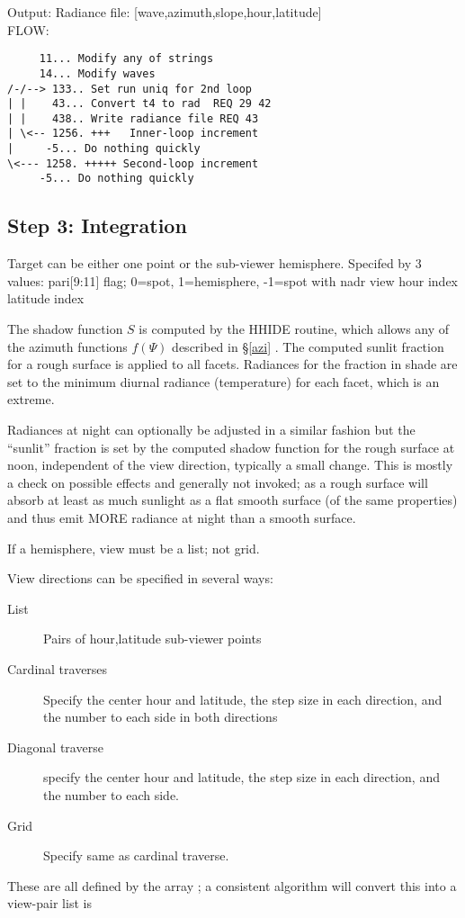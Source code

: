\documentclass{article}
\begin{document}
Output:  Radiance file: [wave,azimuth,slope,hour,latitude]
\\ FLOW:
\vspace{-3.mm} 
\begin{verbatim}
     11... Modify any of strings
     14... Modify waves
/-/--> 133.. Set run uniq for 2nd loop
| |    43... Convert t4 to rad  REQ 29 42
| |    438.. Write radiance file REQ 43
| \<-- 1256. +++   Inner-loop increment
|     -5... Do nothing quickly
\<--- 1258. +++++ Second-loop increment
     -5... Do nothing quickly
\end{verbatim} 

\subsection{Step 3: Integration}
Target can be either one point or the sub-viewer hemisphere. Specifed by 3 values:
pari[9:11] 
\qi flag; 0=spot, 1=hemisphere, -1=spot  with nadr view
\qi hour index
\qi latitude index

The shadow function $S$ is computed by the HHIDE routine, which allows any of the azimuth functions $f(\Psi)$ described in \S \ref{azi} . The computed sunlit fraction for a rough surface is applied to all facets.
Radiances for the fraction in shade are set to the minimum diurnal radiance (temperature) for each facet, which is an extreme.

Radiances at night can optionally be adjusted in a similar fashion but the ``sunlit'' fraction is set by the computed shadow function for the rough surface at noon, independent of the view direction, typically a small change. This is mostly a check on possible effects and generally not invoked; as a rough surface will absorb at least as much sunlight as a flat smooth surface (of the same properties) and thus emit MORE radiance at night than a smooth surface.

If a hemisphere, view must be a list; not grid.

View directions can be specified in several ways: 
\begin{description}    %
 \item [List] Pairs of hour,latitude sub-viewer points
 \item [Cardinal traverses] Specify the center hour and latitude, the step size in each direction, and the number to each side in both directions
 \item [Diagonal traverse]  specify the center hour and latitude, the step size in each direction, and the number to each side.
 \item [Grid] Specify same as cardinal traverse.
\end{description}
These are all defined by the array ; a consistent algorithm will convert this into a view-pair list is 
\end{document}

